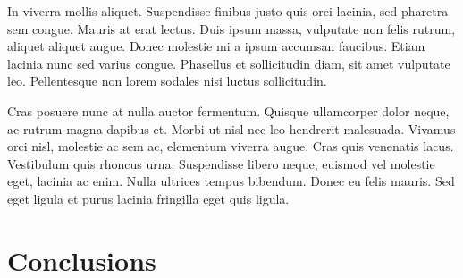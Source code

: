 \documentclass[sigconf]{acmart}
\begin{document}
In viverra mollis aliquet. Suspendisse finibus justo quis orci lacinia, sed pharetra sem congue. Mauris at erat lectus. Duis ipsum massa, vulputate non felis rutrum, aliquet aliquet augue. Donec molestie mi a ipsum accumsan faucibus. Etiam lacinia nunc sed varius congue. Phasellus et sollicitudin diam, sit amet vulputate leo. Pellentesque non lorem sodales nisi luctus sollicitudin.

Cras posuere nunc at nulla auctor fermentum. Quisque ullamcorper dolor neque, ac rutrum magna dapibus et. Morbi ut nisl nec leo hendrerit malesuada. Vivamus orci nisl, molestie ac sem ac, elementum viverra augue. Cras quis venenatis lacus. Vestibulum quis rhoncus urna. Suspendisse libero neque, euismod vel molestie eget, lacinia ac enim. Nulla ultrices tempus bibendum. Donec eu felis mauris. Sed eget ligula et purus lacinia fringilla eget quis ligula.




\section{Conclusions}


\end{document}
